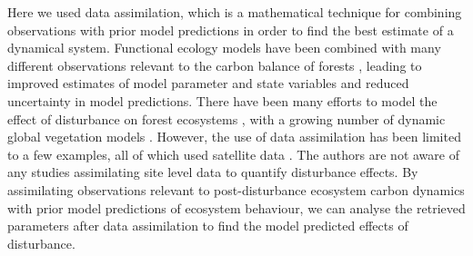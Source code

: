 \documentclass[draft,linenumbers]{agujournal}
\begin{document}
Here we used data assimilation{\color{blue},} which is a mathematical technique for combining observations with prior model predictions in order to find the best estimate of a dynamical system. Functional ecology models have been combined with many different observations relevant to the carbon balance of forests \citep{Quaife2008, fox2009reflex, zobitz2011primer, richardson2010estimating, Zobitz2014, Niu2014, Pinnington2016299}, leading to improved estimates of model parameter and state variables and reduced uncertainty in model predictions. There have been many efforts to model the effect of disturbance on forest ecosystems \citep{thornton2002modeling, seidl2011modelling}, {\color{blue}with a growing number of dynamic global vegetation models \citep{sitch2008evaluation}}. However, the use of data assimilation has been limited to a few examples, all of which used satellite data \citep{hilker2009new, kantzas2015improving}. The authors are not aware of any studies assimilating site level data to quantify disturbance effects. By assimilating observations relevant to post-disturbance ecosystem carbon dynamics with prior model predictions of ecosystem behaviour, we can analyse the retrieved parameters after data assimilation to find the model predicted effects of disturbance.   
\end{document}
